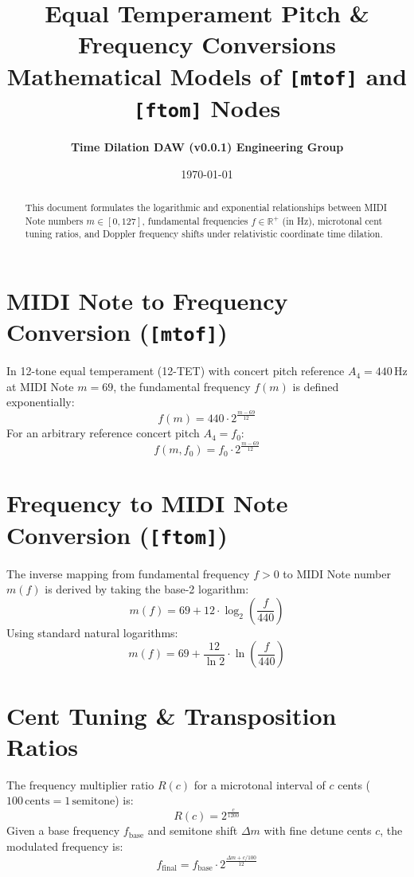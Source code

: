\documentclass[11pt,a4paper]{article}
\title{\textbf{\Huge Equal Temperament Pitch \& Frequency Conversions}\\[0.5em]
\Large Mathematical Models of \texttt{[mtof]} and \texttt{[ftom]} Nodes}
\author{\textbf{Time Dilation DAW (v0.0.1) Engineering Group}}
\date{\today}
\begin{document}
\maketitle

\begin{abstract}
This document formulates the logarithmic and exponential relationships between MIDI Note numbers $m \in [0, 127]$, fundamental frequencies $f \in \mathbb{R}^+$ (in Hz), microtonal cent tuning ratios, and Doppler frequency shifts under relativistic coordinate time dilation.
\end{abstract}

\section{MIDI Note to Frequency Conversion (\texttt{[mtof]})}
In 12-tone equal temperament (12-TET) with concert pitch reference $A_4 = 440\,\text{Hz}$ at MIDI Note $m = 69$, the fundamental frequency $f(m)$ is defined exponentially:
\begin{equation}
f(m) = 440 \cdot 2^{\frac{m - 69}{12}}
\end{equation}
For an arbitrary reference concert pitch $A_4 = f_0$:
\begin{equation}
f(m, f_0) = f_0 \cdot 2^{\frac{m - 69}{12}}
\end{equation}

\section{Frequency to MIDI Note Conversion (\texttt{[ftom]})}
The inverse mapping from fundamental frequency $f > 0$ to MIDI Note number $m(f)$ is derived by taking the base-2 logarithm:
\begin{equation}
m(f) = 69 + 12 \cdot \log_2\left(\frac{f}{440}\right)
\end{equation}
Using standard natural logarithms:
\begin{equation}
m(f) = 69 + \frac{12}{\ln 2} \cdot \ln\left(\frac{f}{440}\right)
\end{equation}

\section{Cent Tuning \& Transposition Ratios}
The frequency multiplier ratio $R(c)$ for a microtonal interval of $c$ cents ($100\,\text{cents} = 1\,\text{semitone}$) is:
\begin{equation}
R(c) = 2^{\frac{c}{1200}}
\end{equation}
Given a base frequency $f_{\text{base}}$ and semitone shift $\Delta m$ with fine detune cents $c$, the modulated frequency is:
\begin{equation}
f_{\text{final}} = f_{\text{base}} \cdot 2^{\frac{\Delta m + c/100}{12}}
\end{equation}
\end{document}
